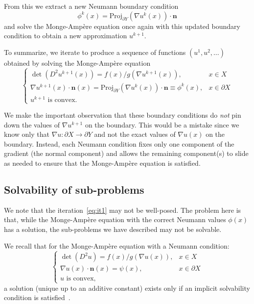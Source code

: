 \documentclass{amsart}
\theoremstyle{lemma}
\theoremstyle{remark}
\begin{document}
From this we extract a new Neumann boundary condition
\[ {\phi^k}(x) = \text{Proj}_{\partial Y} (\nabla{u^k}(x))\cdot{\mathbf{n}} \]
and solve the {{Monge-Amp\`ere}\xspace} equation once again with this updated boundary condition to obtain a new approximation ${u^{k+1}}$.

To summarize, we iterate to produce a sequence of functions $(u^1,u^2,\ldots)$ obtained by solving the {{Monge-Amp\`ere}\xspace} equation
\begin{equation}\label{eq:it1}
\begin{cases}
\det(D^2{u^{k+1}}(x)) = f(x)/g(\nabla{u^{k+1}}(x)), & x\in X\\
\nabla{u^{k+1}}(x)\cdot{\mathbf{n}}(x) = \text{Proj}_{\partial Y} (\nabla{u^k}(x))\cdot{\mathbf{n}} \equiv {\phi^k}(x), & x\in\partial X\\
{u^{k+1}} \text{ is convex.}
\end{cases}
\end{equation}

We make the important observation that these boundary conditions do \emph{not} pin down the values of $\nabla{u^{k+1}}$ on the boundary.  This would be a mistake since we know only that $\nabla u:\partial X\to\partial Y$ and not the exact values of $\nabla u(x)$ on the boundary.  Instead, each Neumann condition fixes only one component of the gradient (the normal component) and allows the remaining component(s) to slide as needed to ensure that the {{Monge-Amp\`ere}\xspace} equation is satisfied.  

\subsection{Solvability of sub-problems}\label{sec:solvability}
We note that the iteration~\eqref{eq:it1} may not be well-posed.  The problem here is that, while the {{Monge-Amp\`ere}\xspace} equation with the correct Neumann values $\phi(x)$ has a solution, the sub-problems we have described may not be solvable.

We recall that for the {{Monge-Amp\`ere}\xspace} equation with a Neumann condition:
\[
\begin{cases}
\det(D^2u) = f(x)/g(\nabla u(x)), & x\in X\\
\nabla u(x)\cdot{\mathbf{n}}(x) = \psi(x), & x\in\partial X\\
u \text{ is convex},
\end{cases}
\]
a solution (unique up to an additive constant) exists only if an implicit solvability condition is satisfied~\cite{LionsNeumannMA}.
\end{document}
